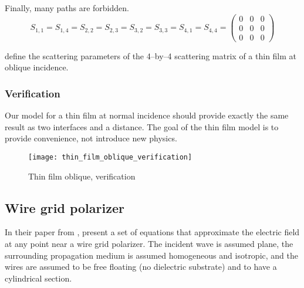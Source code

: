 Finally, many paths are forbidden.
\begin{equation}
    S_{1, 1} = S_{1, 4} = S_{2, 2} = S_{2, 3} =
    S_{3, 2} = S_{3, 3} = S_{4, 1} = S_{4, 4} = 
    \begin{pmatrix}
        0&0&0\\0&0&0\\0&0&0
    \end{pmatrix}
    \label{eq:thin_film_s_zero}
\end{equation}

 define the scattering parameters of the 4--by--4 scattering matrix of a thin film at oblique incidence.


\subsubsection{Verification}
Our model for a thin film at normal incidence should provide exactly the same result as two interfaces and a distance.
The goal of the thin film model is to provide convenience, not introduce new physics.

\begin{figure}[hbtp]
    \centering
    \texttt{[image: thin\_film\_oblique\_verification]}
    \caption{Thin film oblique, verification}
    \label{fig:thin_film_oblique_verification}
\end{figure}

\subsection{Wire grid polarizer}
In their paper from \citeyear{houde_2001} , \textcite{houde_2001} present a set of equations that approximate the electric field at any point near a wire grid polarizer.
The incident wave is assumed plane, the surrounding propagation medium is assumed homogeneous and isotropic, and the wires are assumed to be free floating (no dielectric substrate) and to have a cylindrical section.

